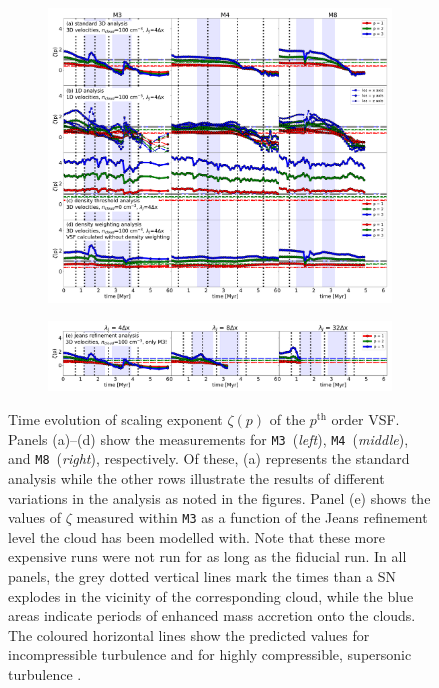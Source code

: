 \documentclass{aa}		%
\begin{document}
\begin{figure}[!htb]
	\centering  
  
  \begin{subfigure}[c]{\textwidth}
      \includegraphics[width=\textwidth]{zeta_all_nojeans.pdf}
      \label{pic:results:zeta_all_nojeans}
  \end{subfigure}
  \begin{subfigure}[c]{\textwidth}
      \addtocounter{subfigure}{4}
      \includegraphics[width=\textwidth]{zeta_jeans.pdf}
      \label{pic:results:zeta_all_jeans}
  \end{subfigure}
  
  \caption{Time evolution of scaling exponent $\zeta(p)$ of the $p^\mathrm{th}$ order VSF. Panels (a)--(d) show the measurements for \texttt{M3}~(\textit{left}), \texttt{M4}~(\textit{middle}), and \texttt{M8}~(\textit{right}), respectively. Of these, (a) represents the standard analysis while the other rows illustrate the results of different variations in the analysis as noted in the figures. Panel (e) shows the values of $\zeta$ measured within \texttt{M3} as a function of the Jeans refinement level the cloud has been modelled with. Note that these more expensive runs were not run for as long as the fiducial run.  In all panels, the grey dotted vertical lines mark the times than a SN explodes in the vicinity of the corresponding cloud, while the blue areas indicate periods of enhanced mass accretion onto the clouds. The coloured horizontal lines show the predicted values for incompressible turbulence \citep[dash-dotted lines;][]{She1994} and for highly compressible, supersonic turbulence \citep[dashed lines;][]{Boldyrev2002}.}
	\label{pic:results:zeta_all}
\end{figure}
\end{document}
